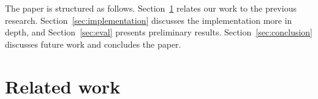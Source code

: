 The paper is structured as follows. Section~\ref{sec:prev} relates our
work to the previous research. 
Section~\ref{sec:implementation} discusses the implementation more in depth, and
Section~\ref{sec:eval} presents preliminary results. 
Section~\ref{sec:conclusion} discusses future work and concludes the paper.














\section{Related work}
\label{sec:prev}



